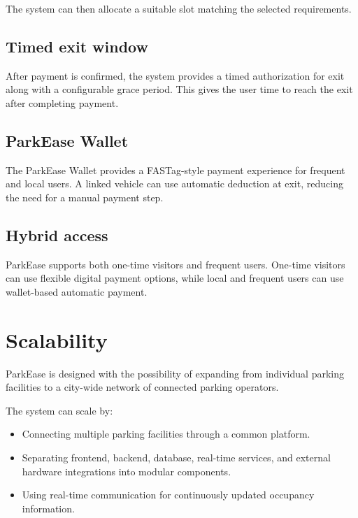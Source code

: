 \documentclass[12pt,a4paper]{article}
\begin{document}
\begin{enumerate}
The system can then allocate a suitable slot matching the selected requirements.

\subsection{Timed exit window}

After payment is confirmed, the system provides a timed authorization for exit along with a configurable grace period. This gives the user time to reach the exit after completing payment.

\subsection{ParkEase Wallet}

The ParkEase Wallet provides a FASTag-style payment experience for frequent and local users. A linked vehicle can use automatic deduction at exit, reducing the need for a manual payment step.

\subsection{Hybrid access}

ParkEase supports both one-time visitors and frequent users. One-time visitors can use flexible digital payment options, while local and frequent users can use wallet-based automatic payment.


\section{Scalability}

ParkEase is designed with the possibility of expanding from individual parking facilities to a city-wide network of connected parking operators.

The system can scale by:

\begin{itemize}
    \item Connecting multiple parking facilities through a common platform.

    \item Separating frontend, backend, database, real-time services, and external hardware integrations into modular components.

    \item Using real-time communication for continuously updated occupancy information.


\end{itemize}
\end{enumerate}
\end{document}
